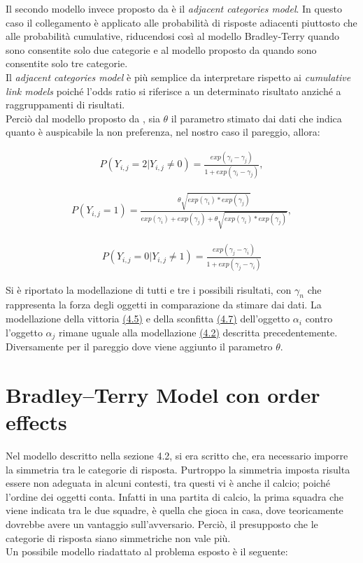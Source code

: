 Il secondo modello invece proposto da \autocite{agresti1992analysis} è il \emph{adjacent categories model}. In questo caso il collegamento è applicato alle probabilità di risposte adiacenti piuttosto che alle probabilità cumulative, riducendosi così al modello Bradley-Terry quando sono consentite solo due categorie e al modello proposto da \autocite{davidson1970extending} quando sono consentite solo tre categorie.\\
Il \emph{adjacent categories model} è più semplice da interpretare rispetto ai \emph{cumulative link models} poiché l'odds ratio si riferisce a un determinato risultato anziché a raggruppamenti di risultati. \\
Perciò dal modello proposto da \autocite{davidson1970extending}, sia $\theta$ il parametro stimato dai dati che indica quanto è auspicabile la non preferenza, nel nostro caso il pareggio, allora:

\begin{align}
	P(Y_{i,j} = 2 | Y_{i,j} \not = 0) =  \frac{exp(\gamma_{i} - \gamma_{j})}{1 + exp(\gamma_{i} - \gamma_{j})}, \label{for:4.5}
\end{align}
	
\begin{align}
	P(Y_{i,j} = 1) =  \frac{\theta \sqrt{exp(\gamma_{i}) * exp(\gamma_{j})}}{exp(\gamma_{i}) + exp(\gamma_{j}) + \theta\sqrt{exp(\gamma_{i}) * exp(\gamma_{j})}}, 
\end{align}

\begin{align}	
	P(Y_{i,j} = 0 | Y_{i,j} \not = 1) =  \frac{exp(\gamma_{j} - \gamma_{i})}{1 + exp(\gamma_{j} - \gamma_{i})}\label{for:4.7}
\end{align}

Si è riportato la modellazione di tutti e tre i possibili risultati, con $\gamma_{n}$ che rappresenta la forza degli oggetti in comparazione da stimare dai dati. La modellazione della vittoria \hyperref[for:4.5]{(4.5)} e della sconfitta \hyperref[for:4.7]{(4.7)} dell'oggetto $\alpha_{i}$ contro l'oggetto $\alpha_{j}$ rimane uguale alla modellazione \hyperref[for:3.1]{(4.2)} descritta precedentemente. Diversamente per il pareggio dove viene aggiunto il parametro $\theta$. \\

\section{Bradley–Terry Model con order effects} \label{sez:4.3}
Nel modello descritto nella sezione 4.2, si era scritto che, era necessario imporre la simmetria tra le categorie di risposta. Purtroppo la simmetria imposta risulta essere non adeguata in alcuni contesti, tra questi vi è anche il calcio; poiché l'ordine dei oggetti conta. Infatti in una partita di calcio, la prima squadra che viene indicata tra le due squadre, è quella che gioca in casa, dove teoricamente dovrebbe avere un vantaggio sull'avversario. Perciò, il presupposto che le categorie di risposta siano simmetriche non vale più. \\
Un possibile modello riadattato al problema esposto è il seguente:

